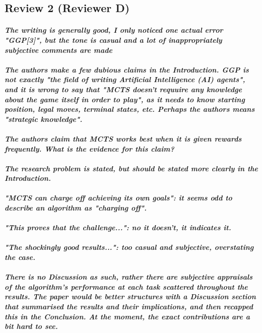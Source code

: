 \documentclass{article}
\begin{document}
\subsection{Review 2 (Reviewer D)}
\paragraph*{\textit{The writing is generally good, I only noticed one actual error "GGP[3]", but the tone is casual and a lot of inappropriately subjective comments are made}}
\paragraph*{\textit{The authors make a few dubious claims in the Introduction. GGP is not exactly "the field of writing Artificial Intelligence (AI) agents", and it is wrong to say that "MCTS doesn't requuire any knowledge about the game itself in order to play", as it needs to know starting position, legal moves, terminal states, etc. Perhaps the authors means "strategic knowledge". }}
\paragraph*{\textit{The authors claim that MCTS works best when it is given rewards frequently. What is the evidence for this claim?}}
\paragraph*{\textit{The research problem is stated, but should be stated more clearly in the Introduction.}}
\paragraph*{\textit{"MCTS can charge off achieving its own goals": it seems odd to describe an algorithm as "charging off".}}
\paragraph*{\textit{"This proves that the challenge...": no it doesn't, it indicates it.}}
\paragraph*{\textit{"The shockingly good results...": too casual and subjective, overstating the case.}}
\paragraph*{\textit{There is no Discussion as such, rather there are subjective appraisals of the algorithm's performance at each task scattered throughout the results. The paper would be better structures with a Discussion section that summarised the results and their implications, and then recapped this in the Conclusion. At the moment, the exact contributions are a bit hard to see.}}
\end{document}
